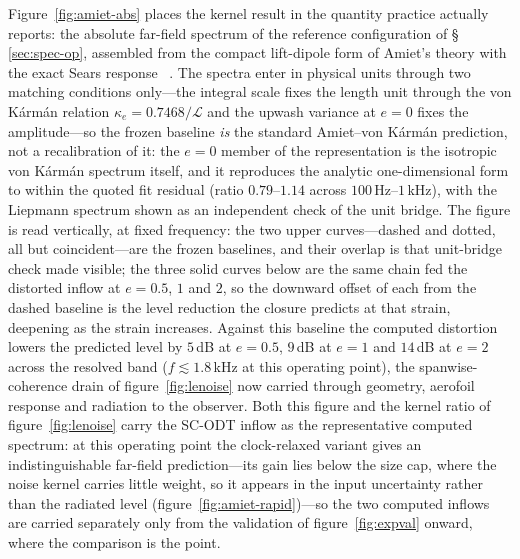 \documentclass[lineno]{JFM-FLM_Au}
\begin{document}
Figure~\ref{fig:amiet-abs} places the kernel result in the quantity
practice actually reports: the absolute far-field spectrum of the
reference configuration of \S\,\ref{sec:spec-op}, assembled from the
compact lift-dipole form of Amiet's theory with the exact Sears
response~ \citep{Sears1941}. The spectra enter in physical units through two matching
conditions only---the integral scale fixes the length unit through the
von K\'arm\'an relation $\kappa_e=0.7468/\mathcal{L}$ and the upwash
variance at $e=0$ fixes the amplitude---so the frozen baseline
\emph{is} the standard Amiet--von K\'arm\'an prediction, not a
recalibration of it: the $e=0$ member of the representation is the
isotropic von K\'arm\'an spectrum itself, and it reproduces the
analytic one-dimensional form to within the quoted fit residual
(ratio $0.79$--$1.14$ across $100$\,Hz--$1$\,kHz), with the Liepmann
spectrum shown as an independent check of the unit bridge. The figure
is read vertically, at fixed frequency: the two upper curves---dashed
and dotted, all but coincident---are the frozen baselines, and their
overlap is that unit-bridge check made visible; the three solid curves
below are the same chain fed the distorted inflow at $e=0.5$, $1$ and
$2$, so the downward offset of each from the dashed baseline is the
level reduction the closure predicts at that strain, deepening as the
strain increases. Against
this baseline the computed distortion lowers the predicted level by
$5$\,dB at $e=0.5$, $9$\,dB at $e=1$ and $14$\,dB at $e=2$ across the
resolved band ($f\lesssim1.8$\,kHz at this operating point), the
spanwise-coherence drain of figure~\ref{fig:lenoise} now carried
through geometry, aerofoil response and radiation to the observer.
Both this figure and the kernel ratio of figure~\ref{fig:lenoise}
carry the SC-ODT inflow as the representative computed spectrum: at
this operating point the clock-relaxed variant gives an
indistinguishable far-field prediction---its gain lies below the
size cap, where the noise kernel carries little weight, so it appears
in the input uncertainty rather than the radiated level
(figure~\ref{fig:amiet-rapid})---so the two computed inflows are
carried separately only from the validation of figure~\ref{fig:expval}
onward, where the comparison is the point.
\end{document}
